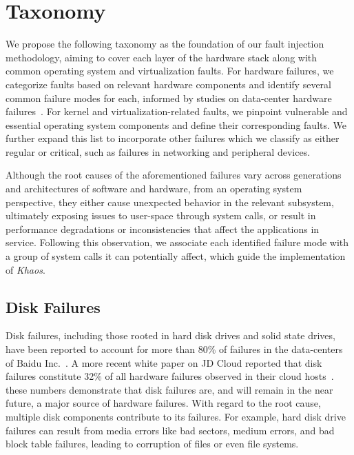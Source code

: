 \section{Taxonomy}

We propose the following taxonomy as the foundation of our fault injection methodology, aiming to cover each layer of the hardware stack along with common operating system and virtualization faults. For hardware failures, we categorize faults based on relevant hardware components and identify several common failure modes for each, informed by studies on data-center hardware failures~\cite{Wang2017, intel2023mca}. For kernel and virtualization-related faults, we pinpoint vulnerable and essential operating system components and define their corresponding faults. We further expand this list to incorporate other failures which we classify as either regular or critical, such as failures in networking and peripheral devices.

Although the root causes of the aforementioned failures vary across generations and architectures of software and hardware, from an operating system perspective, they either cause unexpected behavior in the relevant subsystem, ultimately exposing issues to user-space through system calls, or result in performance degradations or inconsistencies that affect the applications in service. Following this observation, we associate each identified failure mode with a group of system calls it can potentially affect, which guide the implementation of \textit{Khaos}.

\subsection{Disk Failures}

Disk failures, including those rooted in hard disk drives and solid state drives, have been reported to account for more than 80\% of failures in the data-centers of Baidu Inc.~\cite{Wang2017}. A more recent white paper on JD Cloud reported that disk failures constitute 32\% of all hardware failures observed in their cloud hosts~\cite{intel2023mca}.
these numbers demonstrate that disk failures are, and will remain in the near future, a major source of hardware failures. With regard to the root cause, multiple disk components contribute to its failures. For example, hard disk drive failures can result from media errors like bad sectors, medium errors, and bad block table failures, leading to corruption of files or even file systems.

